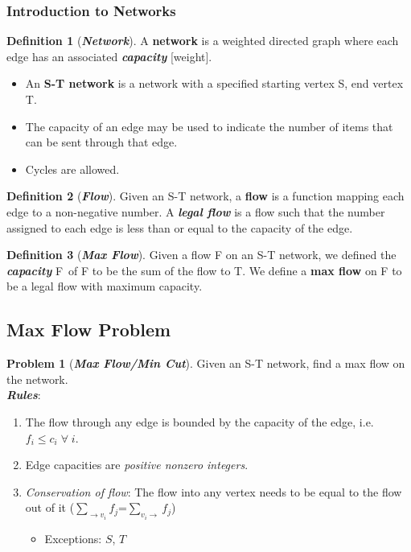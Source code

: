 \documentclass[12pt]{extarticle}
\theoremstyle{definition}
\newtheorem*{definition}{Definition}
\newtheorem*{problem}{Problem}
\theoremstyle{remark}
\newcommand{\probname}[1]{\noindent \textbf{\textit{#1}}}
\begin{document}
\subsubsection*{Introduction to Networks}
\begin{definition}[\probname{Network}]
    A \textbf{network} is a weighted directed graph where each edge has an associated \textbf{\textit{capacity}} [weight]. \begin{itemize}
        \item An \textbf{S-T network} is a network with a specified starting vertex S, end vertex T.
        \item The capacity of an edge may be used to indicate the number of items that can be sent through that edge.
        \item Cycles are allowed.
    \end{itemize}
\end{definition}

\begin{center}
\end{center}

\begin{definition}[\probname{Flow}]
    Given an S-T network, a \textbf{flow} is a function mapping each edge to a non-negative number. A \textbf{\textit{legal flow}} is a flow such that the number assigned to each edge is less than or equal to the capacity of the edge.
\end{definition}
\begin{definition}[\probname{Max Flow}]
    Given a flow F on an S-T network, we defined the \textbf{\textit{capacity}} \textbar F\textbar\ of F to be the sum of the flow to T. We define a \textbf{max flow} on F to be a legal flow with maximum capacity.
\end{definition}

\subsection{Max Flow Problem}
\begin{problem}[\probname{Max Flow/Min Cut}]
    Given an S-T network, find a max flow on the network.\\[5pt]
    \noindent \textbf{\textit{Rules}}: \begin{enumerate}
        \item The flow through any edge is bounded by the capacity of the edge, i.e. $f_i\leq c_i\;\forall\;i$.
        \item Edge capacities are \textit{positive nonzero integers}.
        \item \textit{Conservation of flow}: The flow into any vertex needs to be equal to the flow out of it ($\sum_{\to v_i}f_j$=$\sum_{v_i\to}f_j$) \begin{itemize}
            \item Exceptions: $S$, $T$
        \end{itemize}
    \end{enumerate}
\end{problem}
\end{document}
